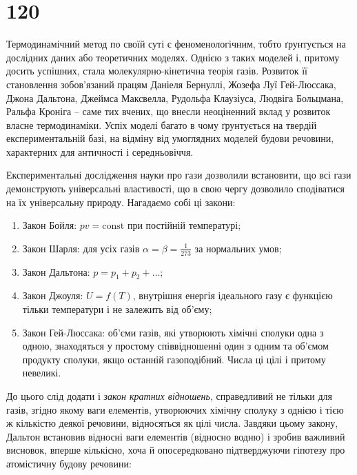 

\section{120}

Термодинамічний метод по своїй суті є феноменологічним, тобто ґрунтується на дослідних даних або
теоретичних моделях. Однією з таких моделей і, притому досить успішних, стала молекулярно-кінетична
теорія газів. Розвиток її становлення зобов'язаний працям Даніеля Бернуллі, Жозефа Луї Гей-Люссака,
Джона Дальтона, Джеймса Максвелла, Рудольфа Клаузіуса, Людвіга Больцмана, Ральфа Кроніга -- саме тих
вчених, що внесли неоціненний вклад у розвиток власне термодинаміки. Успіх моделі багато в чому
ґрунтується на твердій експериментальній базі, на відміну від умоглядних моделей будови речовини,
характерних для античності і середньовіччя.

Експериментальні дослідження науки про гази дозволили встановити, що всі гази демонструють
універсальні властивості, що в свою чергу дозволило сподіватися на їх універсальну природу. Нагадаємо
собі ці закони:

\begin{enumerate}
    \item Закон Бойля: $pv = \text{const}$ при постійній температурі;
    \item Закон Шарля: для усіх газів $\alpha = \beta = \frac{1}{273}$ за нормальних умов;
    \item Закон Дальтона: $p = p_1 + p_2 + \dots$;
    \item Закон Джоуля: $U = f(T)$, внутрішня енергія ідеального газу є функцією тільки температури і
    не залежить від об'єму;
    \item Закон Гей-Люссака: об'єми газів, які утворюють хімічні сполуки одна з одною, знаходяться у
    простому співвідношенні один з одним та об'ємом продукту сполуки, якщо останній газоподібний.
    Числа ці цілі і притому невеликі.
\end{enumerate}

До цього слід додати і \emph{закон кратних відношень}, справедливий не тільки для газів, згідно якому
ваги елементів, утворюючих хімічну сполуку з однією і тією ж кількістю деякої речовини, відносяться як
цілі числа. Завдяки цьому закону, Дальтон встановив відносні ваги елементів (відносно водню) і зробив
важливий висновок, вперше кількісно, хоча й опосередковано підтверджуючи гіпотезу про атомістичну
будову речовини:

